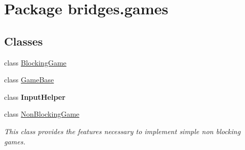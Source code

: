 \hypertarget{namespacebridges_1_1games}{}\section{Package bridges.\+games}
\label{namespacebridges_1_1games}
\subsection*{Classes}
\begin{DoxyCompactItemize}
\item 
class \hyperlink{classbridges_1_1games_1_1_blocking_game}{Blocking\+Game}
\item 
class \hyperlink{classbridges_1_1games_1_1_game_base}{Game\+Base}
\item 
class {\bfseries Input\+Helper}
\item 
class \hyperlink{classbridges_1_1games_1_1_non_blocking_game}{Non\+Blocking\+Game}
\begin{DoxyCompactList}\small\item\em This class provides the features necessary to implement simple non blocking games. \end{DoxyCompactList}\end{DoxyCompactItemize}
